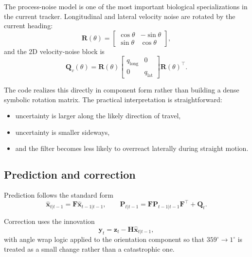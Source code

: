 \documentclass[11pt]{article}
\begin{document}
The process-noise model is one of the most important biological specializations in the current tracker. Longitudinal and lateral velocity noise are rotated by the current heading:
\begin{equation}
  \mathbf{R}(\theta) =
  \begin{bmatrix}
    \cos\theta & -\sin\theta \\
    \sin\theta & \cos\theta
  \end{bmatrix},
\end{equation}
and the 2D velocity-noise block is
\begin{equation}
  \mathbf{Q}_{v}(\theta) =
  \mathbf{R}(\theta)
  \begin{bmatrix}
    q_{\text{long}} & 0 \\
    0 & q_{\text{lat}}
  \end{bmatrix}
  \mathbf{R}(\theta)^\top.
\end{equation}

The code realizes this directly in component form rather than building a dense symbolic rotation matrix. The practical interpretation is straightforward:

\begin{itemize}
  \item uncertainty is larger along the likely direction of travel,
  \item uncertainty is smaller sideways,
  \item and the filter becomes less likely to overreact laterally during straight motion.
\end{itemize}

\subsection{Prediction and correction}

Prediction follows the standard form
\begin{equation}
  \hat{\mathbf{x}}_{t|t-1} = \mathbf{F}\hat{\mathbf{x}}_{t-1|t-1},
  \qquad
  \mathbf{P}_{t|t-1} = \mathbf{F}\mathbf{P}_{t-1|t-1}\mathbf{F}^\top + \mathbf{Q}_t.
\end{equation}

Correction uses the innovation
\begin{equation}
  \mathbf{y}_t = \mathbf{z}_t - \mathbf{H}\hat{\mathbf{x}}_{t|t-1},
\end{equation}
with angle wrap logic applied to the orientation component so that $359^\circ \rightarrow 1^\circ$ is treated as a small change rather than a catastrophic one.
\end{document}
